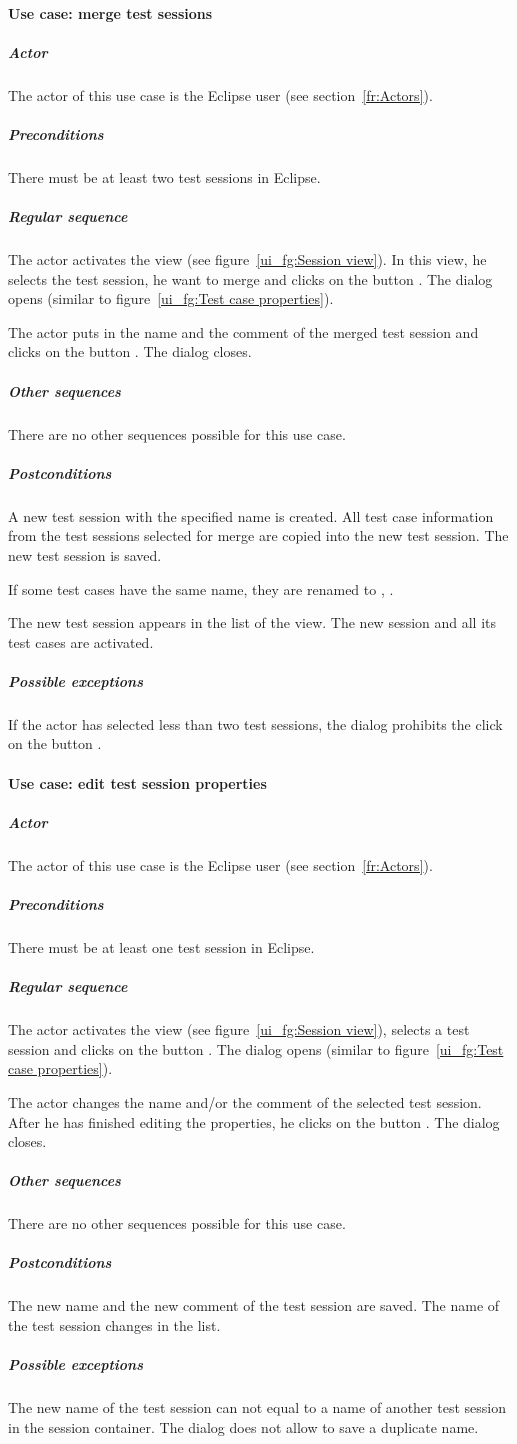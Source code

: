 \paragraph{Use case: merge test sessions} \label{fr:Use case: merge test sessions}
\subparagraph{Actor}
The actor of this use case is the Eclipse user (see section~\ref{fr:Actors}).
\subparagraph{Preconditions}
There must be at least two test sessions in Eclipse.
\subparagraph{Regular sequence}
The actor activates the  view (see figure~\ref{ui_fg:Session view}). In this view, he selects the  test session, he want to merge and clicks on the button . The dialog  opens (similar to figure~\ref{ui_fg:Test case properties}).
\par
The actor puts in the name and the comment of the merged test session and clicks on the button . The dialog closes.
\subparagraph{Other sequences}
There are no other sequences possible for this use case.
\subparagraph{Postconditions}
A new test session with the specified name is created. All test case information from the test sessions selected for merge are copied into the new test session. The new test session is saved.
\par
If some test cases have the same name, they are renamed to , .
\par
The new test session appears in the list of the  view. The new session and all its test cases are activated.
\subparagraph{Possible exceptions}
If the actor has selected less than two test sessions, the dialog prohibits the click on the button .

\paragraph{Use case: edit test session properties}
\subparagraph{Actor}
The actor of this use case is the Eclipse user (see section~\ref{fr:Actors}).
\subparagraph{Preconditions}
There must be at least one test session in Eclipse.
\subparagraph{Regular sequence}
The actor activates the  view (see figure~\ref{ui_fg:Session view}), selects a test session and clicks on the button . The dialog  opens (similar to figure~\ref{ui_fg:Test case properties}).
\par
The actor changes the name and/or the comment of the selected test session. After he has finished editing the properties, he clicks on the button . The dialog closes.
\subparagraph{Other sequences}
There are no other sequences possible for this use case.
\subparagraph{Postconditions}
The new name and the new comment of the test session are saved. The name of the test session changes in the list.
\subparagraph{Possible exceptions}
The new name of the test session can not equal to a name of another test session in the session container. The dialog does not allow to save a duplicate name.

